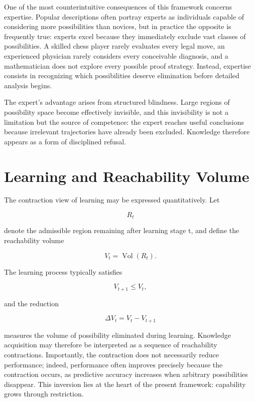 \documentclass[11pt,oneside]{book}
\theoremstyle{plain}
\theoremstyle{definition}
\theoremstyle{remark}
\DeclareMathOperator{\Vol}{Vol}
\begin{document}
One of the most counterintuitive consequences of this framework concerns expertise. Popular descriptions often portray experts as individuals capable of considering more possibilities than novices, but in practice the opposite is frequently true: experts excel because they immediately exclude vast classes of possibilities. A skilled chess player rarely evaluates every legal move, an experienced physician rarely considers every conceivable diagnosis, and a mathematician does not explore every possible proof strategy. Instead, expertise consists in recognizing which possibilities deserve elimination before detailed analysis begins.

The expert's advantage arises from structured blindness. Large regions of possibility space become effectively invisible, and this invisibility is not a limitation but the source of competence: the expert reaches useful conclusions because irrelevant trajectories have already been excluded. Knowledge therefore appears as a form of disciplined refusal.

\section{Learning and Reachability Volume}

The contraction view of learning may be expressed quantitatively. Let

\begin{equation}
R_t
\end{equation}

denote the admissible region remaining after learning stage t, and define the reachability volume

\begin{equation}
V_t
=
\Vol(R_t).
\end{equation}

The learning process typically satisfies

\begin{equation}
V_{t+1}
\leq
V_t,
\end{equation}

and the reduction

\begin{equation}
\Delta V_t
=
V_t - V_{t+1}
\end{equation}

measures the volume of possibility eliminated during learning. Knowledge acquisition may therefore be interpreted as a sequence of reachability contractions. Importantly, the contraction does not necessarily reduce performance; indeed, performance often improves precisely because the contraction occurs, as predictive accuracy increases when arbitrary possibilities disappear. This inversion lies at the heart of the present framework: capability grows through restriction.
\end{document}
